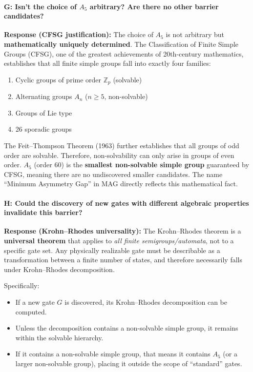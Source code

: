 \documentclass[11pt,a4paper]{article}
\theoremstyle{plain}
\theoremstyle{definition}
\newcommand{\Aalt}{A_5}
\newcommand{\Zp}{\mathbb{Z}_p}
\begin{document}
\paragraph{G: Isn't the choice of $\Aalt$ arbitrary? Are there no other barrier candidates?}
\textbf{Response (CFSG justification):} The choice of $\Aalt$ is not arbitrary but \textbf{mathematically uniquely determined}. The Classification of Finite Simple Groups (CFSG), one of the greatest achievements of 20th-century mathematics, establishes that all finite simple groups fall into exactly four families:
\begin{enumerate}[nosep]
\item Cyclic groups of prime order $\Zp$ (solvable)
\item Alternating groups $A_n$ ($n \geq 5$, non-solvable)
\item Groups of Lie type
\item 26 sporadic groups
\end{enumerate}

The Feit--Thompson Theorem (1963) further establishes that all groups of odd order are solvable. Therefore, non-solvability can only arise in groups of even order. $\Aalt$ (order 60) is the \textbf{smallest non-solvable simple group} guaranteed by CFSG, meaning there are no undiscovered smaller candidates. The name ``Minimum Asymmetry Gap'' in MAG directly reflects this mathematical fact.

\paragraph{H: Could the discovery of new gates with different algebraic properties invalidate this barrier?}
\textbf{Response (Krohn--Rhodes universality):} The Krohn--Rhodes theorem is a \textbf{universal theorem} that applies to \emph{all finite semigroups/automata}, not to a specific gate set. Any physically realizable gate must be describable as a transformation between a finite number of states, and therefore necessarily falls under Krohn--Rhodes decomposition.

Specifically:
\begin{itemize}[nosep]
\item If a new gate $G$ is discovered, its Krohn--Rhodes decomposition can be computed.
\item Unless the decomposition contains a non-solvable simple group, it remains within the solvable hierarchy.
\item If it contains a non-solvable simple group, that means it contains $\Aalt$ (or a larger non-solvable group), placing it outside the scope of ``standard'' gates.
\end{itemize}
\end{document}

